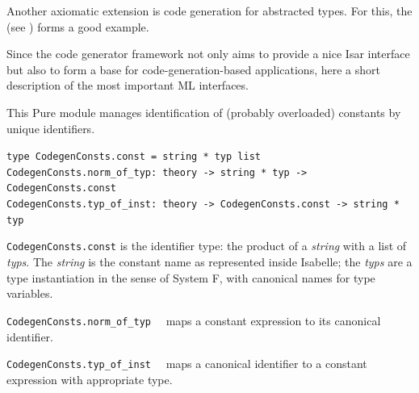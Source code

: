 \begin{isabellebody}
\begin{isamarkuptext}
  Another axiomatic extension is code generation
  for abstracted types.  For this, the  
   (see )
  forms a good example.%
\end{isamarkuptext}%
\isamarkuptrue%
%
\isamarkuptrue%
%
\begin{isamarkuptext}%
Since the code generator framework not only aims to provide
  a nice Isar interface but also to form a base for
  code-generation-based applications, here a short
  description of the most important ML interfaces.%
\end{isamarkuptext}%
\isamarkuptrue%
%
\isamarkuptrue%
%
\begin{isamarkuptext}%
This Pure module manages identification of (probably overloaded)
  constants by unique identifiers.%
\end{isamarkuptext}%
\isamarkuptrue%
%
\isadelimmlref
%
\endisadelimmlref
%
\isatagmlref
%
\begin{isamarkuptext}%
\begin{mldecls}
  \verb|type CodegenConsts.const = string * typ list| \\
  \verb|CodegenConsts.norm_of_typ: theory -> string * typ -> CodegenConsts.const| \\
  \verb|CodegenConsts.typ_of_inst: theory -> CodegenConsts.const -> string * typ| \\
 \end{mldecls}

  \begin{description}

  \item \verb|CodegenConsts.const| is the identifier type:
     the product of a \emph{string} with a list of \emph{typs}.
     The \emph{string} is the constant name as represented inside Isabelle;
     the \emph{typs} are a type instantiation in the sense of System F,
     with canonical names for type variables.

  \item \verb|CodegenConsts.norm_of_typ|~~
     maps a constant expression  to its canonical identifier.

  \item \verb|CodegenConsts.typ_of_inst|~~
     maps a canonical identifier  to a constant
     expression with appropriate type.


\end{description}
\end{isamarkuptext}
\end{isabellebody}
